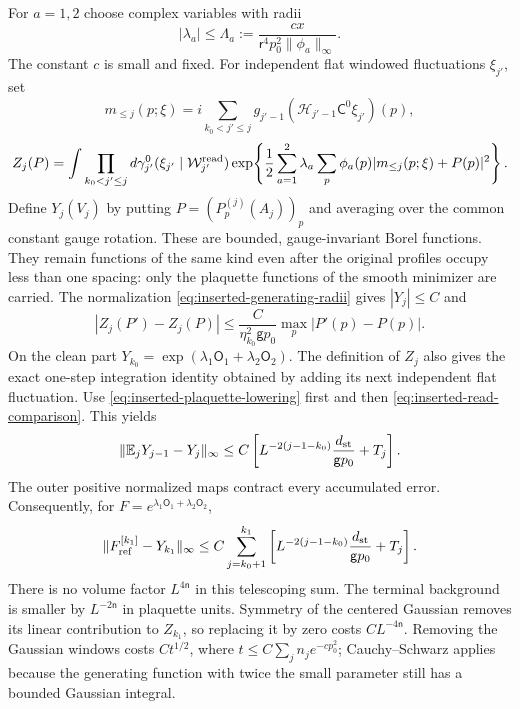 \documentclass[11pt,letterpaper,reqno]{amsart}
\theoremstyle{definition}
\theoremstyle{remark}
\begin{document}
For $a=1,2$ choose complex variables with radii
\begin{equation}\label{eq:inserted-generating-radii}
 |\lambda_a|\le\Lambda_a
       :=\frac{cx}{\mathsf r^4p_0^2\|\phi_a\|_\infty}.
\end{equation}
The constant $c$ is small and fixed. For independent flat windowed
fluctuations $\xi_{j'}$, set
\[
 m_{\le j}(p;\xi)=
 i\sum_{k_0<j'\le j}g_{j'-1}
                    (\mathcal H_{j'-1}\mathsf C^0\xi_{j'})(p),
\]
\[
 Z_j(P)=\int\prod_{k_0<j'\le j}d\gamma_{j'}^0(\xi_{j'}\mid\mathcal W_{j'}^{\rm read})
 \exp\!\left\{\frac12\sum_{a=1}^2\lambda_a\sum_p
                  \phi_a(p)|m_{\le j}(p;\xi)+P(p)|^2\right\}.
\]
Define $Y_j(V_j)$ by putting $P=(P_p^{(j)}(A_j))_p$ and averaging
over the common constant gauge rotation. These are bounded,
gauge-invariant Borel functions. They remain functions of the same
kind even after the original profiles occupy less than one spacing:
only the plaquette functions of the smooth minimizer are carried.
The normalization \eqref{eq:inserted-generating-radii} gives
$|Y_j|\le C$ and
\[
 |Z_j(P')-Z_j(P)|
 \le \frac{C}{\eta_{k_0}^2\mathsf g p_0}
                                 \max_p|P'(p)-P(p)|.
\]
On the clean part $Y_{k_0}=
\exp(\lambda_1\mathsf O_1+\lambda_2\mathsf O_2)$.
The definition of $Z_j$ also gives the exact one-step integration
identity obtained by adding its next independent flat fluctuation.
Use \eqref{eq:inserted-plaquette-lowering} first and then
\eqref{eq:inserted-read-comparison}. This yields
\[
 \|\mathbb E_jY_{j-1}-Y_j\|_\infty
 \le C\left[
 L^{-2(j-1-k_0)}\frac{d_{\rm st}}{\mathsf g p_0}+T_j\right].
\]
The outer positive normalized maps contract every accumulated error.
Consequently, for $F=e^{\lambda_1\mathsf O_1+\lambda_2\mathsf O_2}$,
\begin{equation}\label{eq:inserted-hybrid-telescope}
 \|F_{\rm ref}^{[k_1]}-Y_{k_1}\|_\infty
 \le C\sum_{j=k_0+1}^{k_1}
 \left[L^{-2(j-1-k_0)}
                         \frac{d_{\rm st}}{\mathsf g p_0}+T_j\right].
\end{equation}
There is no volume factor $L^{4\mathsf n}$ in this telescoping sum.
The terminal background is smaller by $L^{-2\mathsf n}$ in
plaquette units. Symmetry of the centered Gaussian removes its
linear contribution to $Z_{k_1}$, so replacing it by zero costs
$CL^{-4\mathsf n}$. Removing the Gaussian windows costs $Ct^{1/2}$,
where $t\le C\sum_jn_je^{-cp_0^2}$; Cauchy--Schwarz applies because
the generating function with twice the small parameter still has a
bounded Gaussian integral.
\end{document}
